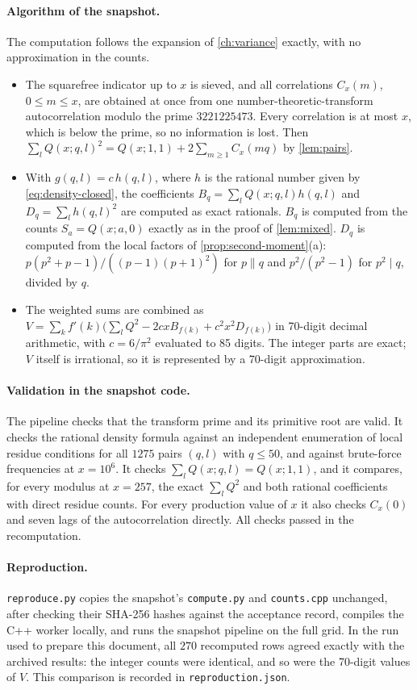 \paragraph{Algorithm of the snapshot.} The computation follows the expansion of \cref{ch:variance} exactly, with no approximation in the counts.
\begin{itemize}
\item The squarefree indicator up to $x$ is sieved, and all correlations $C_x(m)$, $0\le m\le x$, are obtained at once from one number-theoretic-transform autocorrelation modulo the prime $3221225473$. Every correlation is at most $x$, which is below the prime, so no information is lost. Then $\sum_lQ(x;q,l)^2=Q(x;1,1)+2\sum_{m\ge1}C_x(mq)$ by \cref{lem:pairs}.
\item With $g(q,l)=c\,h(q,l)$, where $h$ is the rational number given by \eqref{eq:density-closed}, the coefficients $B_q=\sum_lQ(x;q,l)h(q,l)$ and $D_q=\sum_lh(q,l)^2$ are computed as exact rationals. $B_q$ is computed from the counts $S_a=Q(x;a,0)$ exactly as in the proof of \cref{lem:mixed}. $D_q$ is computed from the local factors of \cref{prop:second-moment}(a): $p(p^2+p-1)/((p-1)(p+1)^2)$ for $p\parallel q$ and $p^2/(p^2-1)$ for $p^2\mid q$, divided by $q$.
\item The weighted sums are combined as $V=\sum_kf'(k)\bigl(\sum_lQ^2-2cxB_{f(k)}+c^2x^2D_{f(k)}\bigr)$ in 70-digit decimal arithmetic, with $c=6/\pi^2$ evaluated to 85 digits. The integer parts are exact; $V$ itself is irrational, so it is represented by a 70-digit approximation.
\end{itemize}

\paragraph{Validation in the snapshot code.} The pipeline checks that the transform prime and its primitive root are valid. It checks the rational density formula against an independent enumeration of local residue conditions for all $1275$ pairs $(q,l)$ with $q\le50$, and against brute-force frequencies at $x=10^6$. It checks $\sum_lQ(x;q,l)=Q(x;1,1)$, and it compares, for every modulus at $x=257$, the exact $\sum_lQ^2$ and both rational coefficients with direct residue counts. For every production value of $x$ it also checks $C_x(0)$ and seven lags of the autocorrelation directly. All checks passed in the recomputation.

\paragraph{Reproduction.} \texttt{reproduce.py} copies the snapshot's \texttt{compute.py} and \texttt{counts.cpp} unchanged, after checking their SHA-256 hashes against the acceptance record, compiles the C++ worker locally, and runs the snapshot pipeline on the full grid. In the run used to prepare this document, all $270$ recomputed rows agreed exactly with the archived results: the integer counts were identical, and so were the 70-digit values of $V$. This comparison is recorded in \texttt{reproduction.json}.

